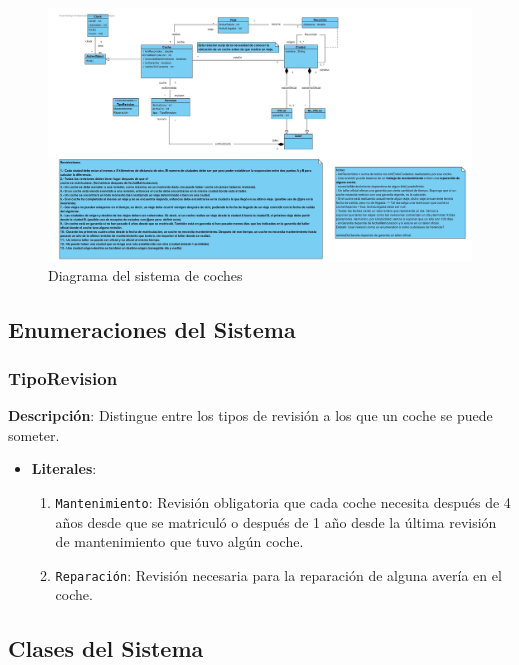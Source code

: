 \documentclass[12pt.a4paper]{article}
\begin{document}
\begin{figure}[H]
     \includegraphics[width=1\linewidth]{diagramas/DiagramaVPP_apartadoA.jpg}
     \caption{Diagrama del sistema de coches}
     \label{Diagrama del sistema de coches}
\end{figure}
\vspace{1.0 cm}

\subsection{Enumeraciones del Sistema}

\subsubsection{TipoRevision}
\textbf{Descripción}:  
Distingue entre los tipos de revisión a los que un coche se puede someter.
\begin{itemize}
    \item \textbf{Literales}:
    \begin{enumerate}
        \item \texttt{Mantenimiento}: Revisión obligatoria que cada coche necesita después de 4 años desde que se matriculó o después de 1 año desde la última revisión de mantenimiento que tuvo algún coche.
        \item \texttt{Reparación}: Revisión necesaria para la reparación de alguna avería en el coche.
    \end{enumerate}
\end{itemize}

\subsection{Clases del Sistema}
\end{document}
